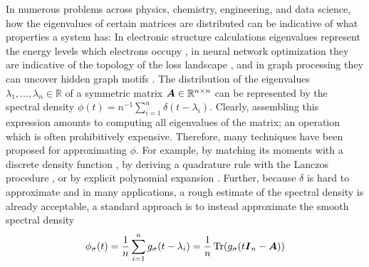 \documentclass[12pt]{article}
\begin{document}
In numerous problems across physics, chemistry, engineering, and data science, how the eigenvalues of certain matrices are distributed can be indicative of what properties a system has: In electronic structure calculations eigenvalues represent the energy levels which electrons occupy \cite{lin-2017-randomized-estimation, drabold-1993-maximum-entropy, ducastelle-1970-moments-developments, haydock-1972-electronic-structure}, in neural network optimization they are indicative of the topology of the loss landscape \cite{yao-2020-pyhessian-neural, ghorbani-2019-investigation-neural}, and in graph processing they can uncover hidden graph motifs \cite{huang-2021-density-states}. The distribution of the eigenvalues $\lambda_1, \dots, \lambda_n \in \mathbb{R}$ of a symmetric matrix $\boldsymbol{A} \in \mathbb{R}^{n \times n}$ can be represented by the spectral density $\phi(t) = n^{-1} \sum_{i=1}^{n} \delta(t - \lambda_i)$. Clearly, assembling this expression amounts to computing all eigenvalues of the matrix; an operation which is often prohibitively expensive. Therefore, many techniques have been proposed for approximating $\phi$. For example, by matching its moments with a discrete density function \cite{cohen-steiner-2018-approximating-spectrum, braverman-2022-sublinear-time}, by deriving a quadrature rule with the Lanczos procedure \cite{lin-2016-approximating-spectral, chen-2021-analysis-stochastic}, or by explicit polynomial expansion \cite{weisse-2006-kernel-polynomial, lin-2016-approximating-spectral}. Further, because $\delta$ is hard to approximate and in many applications, a rough estimate of the spectral density is already acceptable, a standard approach is to instead approximate the smooth spectral density
\begin{equation}
    \phi_{\sigma}(t) = \frac{1}{n} \sum_{i=1}^{n} g_{\sigma}(t - \lambda_i) = \frac{1}{n} \operatorname{Tr}(g_{\sigma}(t \boldsymbol{I}_n - \boldsymbol{A}))
\end{equation}
\end{document}
